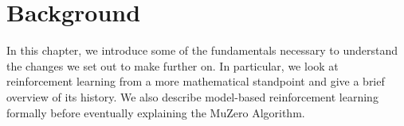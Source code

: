 \section{Background}
In this chapter, we introduce some of the fundamentals necessary to understand the changes we set out to make further on. In particular, we look at reinforcement learning from a more mathematical standpoint and give a brief overview of its history. We also describe model-based reinforcement learning formally before eventually explaining the MuZero Algorithm.







